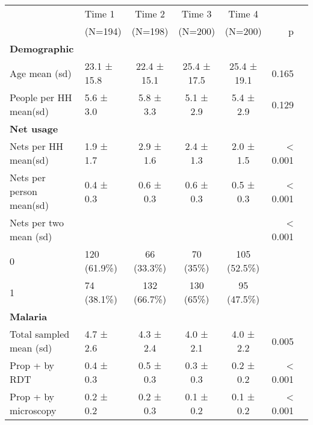 \documentclass[smallextended]{svjour3}       %
\begin{document}
\begin{table}[!hbtp]
\begin{center}
\begin{small}
\color{black}
\begin{tabular}{llcccrr}
\hline
&Time 1&Time 2&Time 3&Time 4&\\ 
&(N=194)&(N=198)&(N=200)&(N=200)&\multirow{-2}{*}{p}\\ 
\hline
\textbf{Demographic}&&&&&\\ 
Age mean (sd)            &23.1 ± 15.8&22.4 ± 15.1&25.4 ± 17.5&25.4 ± 19.1&0.165\\ 
People per HH mean(sd)   &5.6 ± 3.0&5.8 ± 3.3&5.1 ± 2.9&5.4 ± 2.9&0.129\\ 
\textbf{Net usage}&&&&&\\ 
\cellcolor{yellow}\color{red}Nets per HH mean(sd)     &\cellcolor{yellow}\color{red}1.9 ± 1.7&\cellcolor{yellow}\color{red}2.9 ± 1.6&\cellcolor{yellow}\color{red}2.4 ± 1.3&\cellcolor{yellow}\color{red}2.0 ± 1.5&\cellcolor{yellow}\color{red}< 0.001\\ 
\cellcolor{yellow}\color{red}Nets per person mean(sd) &\cellcolor{yellow}\color{red}0.4 ± 0.3&\cellcolor{yellow}\color{red}0.6 ± 0.3&\cellcolor{yellow}\color{red}0.6 ± 0.3&\cellcolor{yellow}\color{red}0.5 ± 0.3&\cellcolor{yellow}\color{red}< 0.001\\ 
\cellcolor{yellow}\color{red}Nets per two mean (sd)   &\cellcolor{yellow}\color{red}&\cellcolor{yellow}\color{red}&\cellcolor{yellow}\color{red}&\cellcolor{yellow}\color{red}&\cellcolor{yellow}\color{red}< 0.001\\ 
 \hspace{0.5cm} 0                    &120 (61.9\%)&66 (33.3\%)&70 (35\%)&105 (52.5\%)&\\ 
 \hspace{0.5cm} 1                    &74 (38.1\%)&132 (66.7\%)&130 (65\%)&95 (47.5\%)&\\ 
\textbf{Malaria}&&&&&\\ 
\cellcolor{yellow}\color{red}Total sampled mean (sd)  &\cellcolor{yellow}\color{red}4.7 ± 2.6&\cellcolor{yellow}\color{red}4.3 ± 2.4&\cellcolor{yellow}\color{red}4.0 ± 2.1&\cellcolor{yellow}\color{red}4.0 ± 2.2&\cellcolor{yellow}\color{red}0.005\\ 
\cellcolor{yellow}\color{red}Prop + by RDT            &\cellcolor{yellow}\color{red}0.4 ± 0.3&\cellcolor{yellow}\color{red}0.5 ± 0.3&\cellcolor{yellow}\color{red}0.3 ± 0.3&\cellcolor{yellow}\color{red}0.2 ± 0.2&\cellcolor{yellow}\color{red}< 0.001\\ 
\cellcolor{yellow}\color{red}Prop + by microscopy     &\cellcolor{yellow}\color{red}0.2 ± 0.2&\cellcolor{yellow}\color{red}0.2 ± 0.3&\cellcolor{yellow}\color{red}0.1 ± 0.2&\cellcolor{yellow}\color{red}0.1 ± 0.2&\cellcolor{yellow}\color{red}< 0.001\\ 
\hline
\end{tabular}
\end{small}
\end{center}
\end{table}
\end{document}
